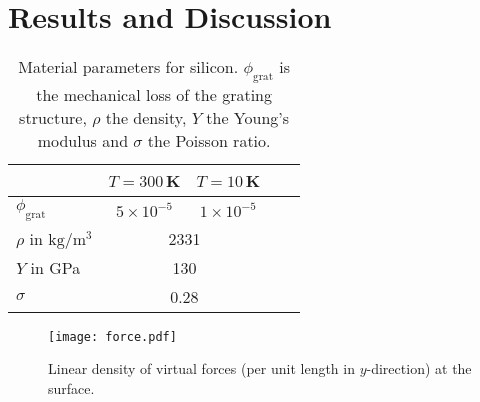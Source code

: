 \documentclass[twocolumn,secnumarabic,amssymb, nobibnotes, aps, prd, showpacs]{revtex4-1}
\begin{document}
\section{Results and Discussion}
\label{sec:results}
\begin{table}[tb]
\begin{center}
	\caption{Material parameters for silicon. $\phi_\mathrm{grat}$ is the mechanical loss of the grating structure, $\rho$ the density, $Y$ the Young's modulus and $\sigma$ the Poisson ratio.}\vspace{0.5cm}
  \begin{tabular*}{\columnwidth}{l@{\extracolsep\fill}cccc}
		\hline\hline
     & $T=300$\,K & $T=10$\,K \\ \hline
   $\phi_\mathrm{grat}$ & $5\times10^{-5}$ \cite{Yas2000} & $1\times10^{-5}$ \cite{Mam2001} \\
	$\rho$ in $\mathrm{kg/m^3}$&  \multicolumn{2}{c}{2331}\\
		$Y$ in GPa & \multicolumn{2}{c}{130 \cite{Wor1965}}  \\
    $\sigma$ & \multicolumn{2}{c}{0.28 \cite{Wor1965}}\\  \hline
  \end{tabular*}
	\label{tab:material}
\end{center}
\end{table}
\begin{figure}[b]
	\centering
		\texttt{[image: force.pdf]}
	\caption{Linear density of virtual forces (per unit length in $y$-direction) at the surface.}
	\label{fig:force}
\end{figure}
\end{document}

